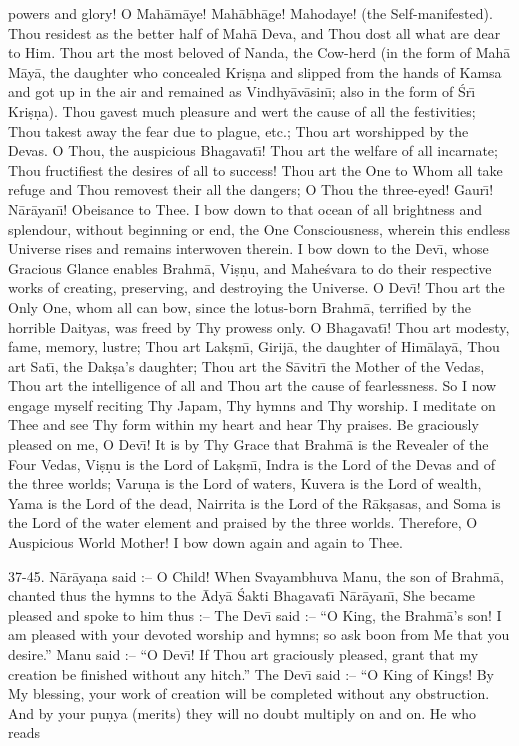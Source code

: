powers and glory! O Mah\=am\=aye! Mah\=abh\=age! Mahodaye! (the Self-manifested). Thou residest as the better half of Mah\=a Deva, and Thou dost all what are dear to Him. Thou art the most beloved of Nanda, the Cow-herd (in the form of Mah\=a M\=ay\=a, the daughter who concealed Kri\d{s}\d{n}a and slipped from the hands of Kamsa and got up in the air and remained as Vindhy\=av\=asin\={\i}; also in the form of \'Sr\={\i} Kri\d{s}\d{n}a). Thou gavest much pleasure and wert the cause of all the festivities; Thou takest away the fear due to plague, etc.; Thou art worshipped by the Devas. O Thou, the auspicious Bhagavat\={\i}! Thou art the welfare of all incarnate; Thou fructifiest the desires of all to success! Thou art the One to Whom all take refuge and Thou removest their all the dangers; O Thou the three-eyed! Gaur\={\i}! N\=ar\=ayan\={\i}! Obeisance to Thee. I bow down to that ocean of all brightness and splendour, without beginning or end, the One Consciousness, wherein this endless Universe rises and remains interwoven therein. I bow down to the Dev\={\i}, whose Gracious Glance enables Brahm\=a, Vi\d{s}\d{n}u, and Mahe\'svara to do their respective works of creating, preserving, and destroying the Universe. O Dev\={\i}! Thou art the Only One, whom all can bow, since the lotus-born Brahm\=a, terrified by the horrible Daityas, was freed by Thy prowess only. O Bhagavat\={\i}! Thou art modesty, fame, memory, lustre; Thou art Lak\d{s}m\={\i}, Girij\=a, the daughter of Him\=alay\=a, Thou art Sat\={\i}, the Dak\d{s}a's daughter; Thou art the S\=avitr\={\i} the Mother of the Vedas, Thou art the intelligence of all and Thou art the cause of fearlessness. So I now engage myself reciting Thy Japam, Thy hymns and Thy worship. I meditate on Thee and see Thy form within my heart and hear Thy praises. Be graciously pleased on me, O Dev\={\i}! It is by Thy Grace that Brahm\=a is the Revealer of the Four Vedas, Vi\d{s}\d{n}u is the Lord of Lak\d{s}m\={\i}, Indra is the Lord of the Devas and of the three worlds; Varu\d{n}a is the Lord of waters, Kuvera is the Lord of wealth, Yama is the Lord of the dead, Nairrita is the Lord of the R\=ak\d{s}asas, and Soma is the Lord of the water element and praised by the three worlds. Therefore, O Auspicious World Mother! I bow down again and again to Thee.

37-45. N\=ar\=aya\d{n}a said :-- O Child! When Svayambhuva Manu, the son of Brahm\=a, chanted thus the hymns to the \=Ady\=a \'Sakti Bhagavat\={\i} N\=ar\=ayan\={\i}, She became pleased and spoke to him thus :-- The Dev\={\i} said :-- ``O King, the Brahm\=a's son! I am pleased with your devoted worship and hymns; so ask boon from Me that you desire.'' Manu said :-- ``O Dev\={\i}! If Thou art graciously pleased, grant that my creation be finished without any hitch.'' The Dev\={\i} said :-- ``O King of Kings! By My blessing, your work of creation will be completed without any obstruction. And by your pu\d{n}ya (merits) they will no doubt multiply on and on. He who reads

